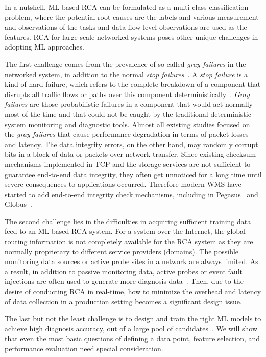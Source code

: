 In a nutshell, ML-based RCA can be formulated as a multi-class classification problem, where the potential root causes are the labels and various 
measurement and observations of the tasks and data flow level observations are used as the features.
RCA for large-scale networked systems poses other unique challenges in adopting ML approaches.
 
The first challenge comes from the prevalence of so-called {\it gray failures} in the networked system, in addition to the normal {\it stop failures}~\cite{GrayFailure:2017,DeepView:NSDI18}. A {\it stop failure} is a kind of hard failure, which refers to the complete breakdown of a component that disrupts all traffic flows or paths over this component deterministically~\cite{Link-JIoT-2019}. {\it Gray failures} are those probabilistic failures in a component that would act normally most of the time and that could not be caught by the traditional deterministic system monitoring and diagnostic tools. Almost all existing studies focused on the {\it gray failures} that cause performance degradation in terms of packet losses and latency.  The data integrity errors, on the other hand, may randomly corrupt bits in a block of data or packets over network transfer. Since existing checksum mechanisms implemented in TCP and the storage services are not sufficient to guarantee end-to-end data integrity, they often get unnoticed for a long time until severe consequences to applications occurred. Therefore modern WMS have started to add end-to-end integrity check mechanisms, including in Pegasus~\cite{swip:pearc:2019} and Globus~\cite{IntegrityVerification:DataTransfer}.

The second challenge lies in the difficulties in acquiring sufficient training data feed to an ML-based RCA system. For a system over the Internet, the global routing information is not completely available for the RCA system as they are normally proprietary to different service providers (domains). The possible monitoring data sources or active probe sites in a network are always limited. As a result, in addition to passive monitoring data, active probes or event fault injections are often used to generate more diagnosis data~\cite{active:iot:2019, NetPoirot:Sigcomm2016}. Then, due to the desire of conducting RCA in real-time, how to minimize the overhead and latency of data collection in a production setting becomes a significant design issue.

The last but not the least challenge is to design and train the right ML models to achieve high diagnosis accuracy, out of a large pool of candidates~\cite{Boutaba:2018aa}. We will show that even the most basic questions of defining a data point, feature selection, and performance evaluation need special consideration.

